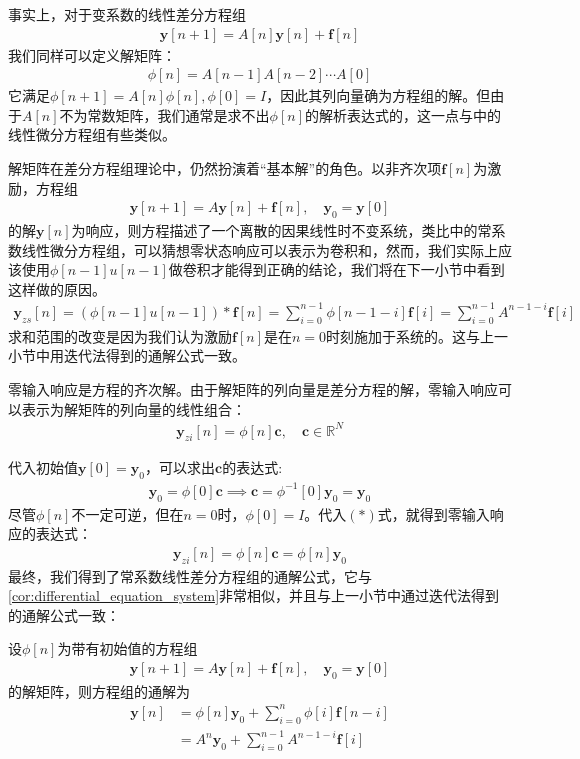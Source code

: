 事实上，对于变系数的线性差分方程组\begin{align*}
    \mathbf{y}[n+1] = A[n] \mathbf{y}[n]+ \mathbf{f}[n]
\end{align*}
我们同样可以定义解矩阵：
\begin{align*}
    \phi[n] = A[n-1] A[n-2] \cdots A[0]
\end{align*}
它满足$\phi[n+1] = A[n] \phi[n],\phi[0] = I$，因此其列向量确为方程组的解。但由于$A[n]$不为常数矩阵，我们通常是求不出$\phi[n]$的解析表达式的，这一点与中的线性微分方程组有些类似。

解矩阵在差分方程组理论中，仍然扮演着“基本解”的角色。以非齐次项$\mathbf{f}[n]$为激励，方程组\begin{align*}
    \mathbf{y}[n+1] = A \mathbf{y}[n] + \mathbf{f}[n],\quad \mathbf{y}_0 = \mathbf{y}[0]
\end{align*}
的解$\mathbf{y}[n]$为响应，则方程描述了一个离散的因果线性时不变系统，类比中的常系数线性微分方程组，可以猜想零状态响应可以表示为卷积和，然而，我们实际上应该使用$\phi[n-1]u[n-1]$做卷积才能得到正确的结论，我们将在下一小节中看到这样做的原因。\begin{align*}
    \mathbf{y}_{zs}[n] = (\phi[n-1]u[n-1]) * \mathbf{f}[n]=\sum_{i=0}^{n-1} \phi[n-1-i]\mathbf{f}[i]=\sum_{i=0}^{n-1} A^{n-1-i} \mathbf{f}[i]
\end{align*}
求和范围的改变是因为我们认为激励$\mathbf{f}[n]$是在$n=0$时刻施加于系统的。这与上一小节中用迭代法得到的通解公式一致。

零输入响应是方程的齐次解。由于解矩阵的列向量是差分方程的解，零输入响应可以表示为解矩阵的列向量的线性组合：\begin{align*}
    \mathbf{y}_{zi}[n] = \phi[n]\mathbf{c},\quad \mathbf{c}\in\mathbb{R}^N\tag{$*$}
\end{align*}

代入初始值$\mathbf{y}[0]=\mathbf{y}_0$，可以求出$\mathbf{c}$的表达式:
\begin{align*}
    \mathbf{y}_0 = \phi[0]\mathbf{c}\implies \mathbf{c} = \phi^{-1}[0]\mathbf{y}_0 = \mathbf{y}_0
\end{align*}
尽管$\phi[n]$不一定可逆，但在$n=0$时，$\phi[0]=I$。代入$(*)$式，就得到零输入响应的表达式：
\begin{align*}
    \mathbf{y}_{zi}[n] = \phi[n]\mathbf{c} = \phi[n]\mathbf{y}_0
\end{align*}
最终，我们得到了常系数线性差分方程组的通解公式，它与\cref{cor:differential_equation_system}非常相似，并且与上一小节中通过迭代法得到的通解公式一致：
\begin{theorem}
    设$\phi[n]$为带有初始值的方程组\begin{align*}
        \mathbf{y}[n+1] = A \mathbf{y}[n]+\mathbf{f}[n],\quad \mathbf{y}_0 = \mathbf{y}[0]
    \end{align*}
    的解矩阵，则方程组的通解为\begin{align*}
        \mathbf{y}[n]& = \phi[n]\mathbf{y}_0 + \sum_{i=0}^{n} \phi[i]\mathbf{f}[n-i]\\
        & = A^n \mathbf{y}_0 + \sum_{i=0}^{n-1} A^{n-1-i} \mathbf{f}[i]
    \end{align*}
\end{theorem}


